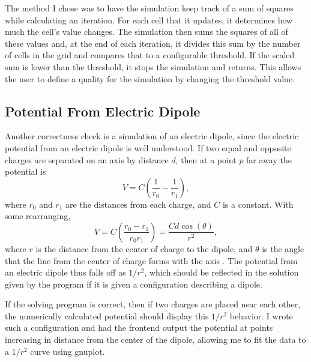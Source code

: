 The method I chose was to have the simulation keep track of a sum of squares while calculating an iteration. For each cell
that it updates, it determines how much the cell's value changes. The simulation then sums the squares of all of these values
and, at the end of each iteration, it divides this sum by the number of cells in the grid and compares that to a configurable threshold.
If the scaled sum is lower than the threshold, it stops the simulation and returns. This allows the user to define a quality for
the simulation by changing the threshold value.









\subsection{Potential From Electric Dipole}
Another correctness check is a simulation of an electric dipole, since the electric potential from an electric dipole is well understood.
If two equal and opposite charges are separated on an axis by distance $d$, then at a point $p$ far away the
potential is
$$V = C\left(\frac{1}{r_0} - \frac{1}{r_1}\right),$$
where $r_0$ and $r_1$ are the distances from each charge, and $C$ is a constant. With some rearranging,
$$V = C\left(\frac{r_0 - r_1}{r_0 r_1}\right) = \frac{C d \cos(\theta)}{r^2},$$
where $r$ is the distance from the center of charge to the dipole, and $\theta$ is the angle that the line from the
center of charge forms with the axis \cite{griffiths}. The potential from an electric dipole thus falls off as $1/r^2$,
which should be reflected in the solution given by the program if it is given a configuration describing a dipole.

If the solving program is correct, then if two charges are placed near each other, the numerically calculated potential
should display this $1/r^2$ behavior. I wrote such a configuration and had the frontend output the potential at points
increasing in distance from the center of the dipole, allowing me to fit the data to a $1/r^2$ curve using gnuplot.















